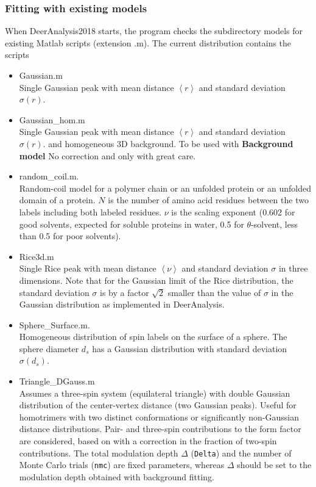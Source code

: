 \documentclass{article}
\begin{document}
\subsubsection{Fitting with existing models}
\label{fit_existing}
When DeerAnalysis2018 starts, the program checks the subdirectory {\ttfamily models} for existing Matlab scripts (extension {\ttfamily .m}). The current distribution contains the scripts 
\begin{itemize}
	\item {\ttfamily Gaussian.m} \\ Single Gaussian peak with mean distance $\left\langle r \right\rangle$ and standard deviation $\sigma(r)$.
	\item {\ttfamily Gaussian\_hom.m} \\ Single Gaussian peak with mean distance $\left\langle r \right\rangle$ and standard deviation $\sigma(r)$. and homogeneous 3D background. To be used with {\bf Background model} {\ttfamily No correction} and only with great care.
	\item {\ttfamily random\_coil.m}. \\ Random-coil model for a polymer chain or an unfolded protein or an unfolded domain of a protein. $N$ is the number of amino acid residues between the two labels including both labeled
 residues. $\nu$ is the scaling exponent (0.602 for good solvents, expected for soluble proteins in water, 0.5 for $\theta$-solvent, less than 0.5 for poor solvents).
 	\item {\ttfamily Rice3d.m} \\ Single Rice peak \cite{koehler2011} with mean distance $\left\langle \nu\right\rangle$ and standard deviation $\sigma$ in three dimensions. Note that for the Gaussian limit of the Rice distribution, the standard deviation $\sigma$ is by a factor $\sqrt{2}$ smaller than the value of $\sigma$ in the Gaussian distribution as implemented in DeerAnalysis.
\item {\ttfamily Sphere\_Surface.m}. \\ Homogeneous distribution of spin labels on the surface of a sphere. The sphere diameter $d_s$ has a Gaussian distribution with standard deviation $\sigma(d_s)$. 
  \item {\ttfamily Triangle\_DGauss.m} \\ Assumes a three-spin system (equilateral triangle) with double Gaussian distribution of the center-vertex distance (two Gaussian peaks). Useful for homotrimers with two distinct conformations or significantly non-Gaussian distance distributions. Pair- and three-spin contributions to the form factor are considered, based on \cite{jeschke2009} with a correction in the fraction of two-spin contributions. The total modulation depth $\Delta$ (\texttt{Delta}) and the number of Monte Carlo trials (\texttt{nmc}) are fixed parameters, whereas $\Delta$  should be set to the modulation depth obtained with background fitting.  

\end{itemize}
\end{document}
